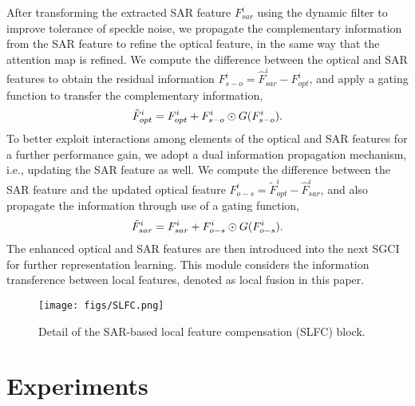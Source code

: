 \documentclass[a4paper,fleqn]{cas-dc}
\newcommand{\ie}[1]{{i.e.}}
\begin{document}
After transforming the extracted SAR feature $ F^i_{sar}$ using the dynamic filter to improve tolerance of speckle noise, we propagate the complementary information from the SAR feature to refine the optical feature, in the same way that the attention map is refined. We compute the difference between the optical and SAR features to obtain the residual information $F^i_{s-o}=\hat{F}^i_{sar}-F^i_{opt}$, and apply a gating function to transfer the complementary information,
\begin{equation}
	\setlength{\abovedisplayskip}{4pt}	
	\setlength{\belowdisplayskip}{4pt}
	\tilde{F}^i_{opt} = {F}^i_{opt} + F^i_{s-o}\odot G(F^i_{s-o}).
\end{equation}
To better exploit interactions among elements of the optical and SAR features for a further performance gain, we adopt a dual information propagation
mechanism, \ie{}, updating the SAR feature as well. We compute the difference between the SAR feature and the updated optical feature $F^i_{o-s}=\tilde{F}^i_{opt}-\hat{F}^i_{sar}$, and also propagate the information through use of a gating function,
\begin{equation}
	\setlength{\abovedisplayskip}{4pt}	
	\setlength{\belowdisplayskip}{4pt}
	\tilde{F}^i_{sar} = {F}^i_{sar} + F^i_{o-s}\odot G(F^i_{o-s}).
\end{equation}
The enhanced optical and SAR features are then introduced into the next SGCI for further representation learning. This module considers the information transference between local features, denoted as local fusion in this paper.

\begin{figure}[!t]
	\centering
	\texttt{[image: figs/SLFC.png]}
	\caption{Detail of the SAR-based local feature compensation (SLFC) block. }
	\label{Fig-SLFC}
	\vspace{-5mm}
\end{figure}

\section{Experiments}
\end{document}
